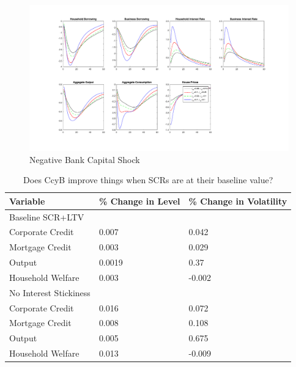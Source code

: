 \documentclass[12pt]{article}
\numberwithin{equation}{section}
\begin{document}
\begin{figure}[H]
\centering
\caption{Negative Bank Capital Shock}
\label{stickinessCAB_figure}
\includegraphics[scale=0.5]{stickinessCAB.pdf}
\end{figure}




\begin{table}[h]
\caption{Does CcyB improve things when SCRs are at their baseline value? }
\label{impact_ccyb_table}
\begin{tabular}{l|l|l}
\small
Variable & \% Change in Level & \% Change in Volatility \\
\hline
Baseline SCR+LTV & & \\
\hline
    Corporate Credit           &       0.007    &      0.042 \\
    Mortgage Credit            &      0.003    &       0.029 \\
    Output         &     0.0019    &    0.37 \\ 
    Household Welfare       &     0.003     &     -0.002\\
  
 \hline
No Interest Stickiness & & \\
\hline

    Corporate Credit           &       0.016    &      0.072 \\
    Mortgage Credit            &      0.008    &       0.108 \\
    Output         &     0.005    &    0.675 \\ 
    Household Welfare       &     0.013     &     -0.009\\
  \end{tabular}
\end{table}



\newpage
\end{document}
